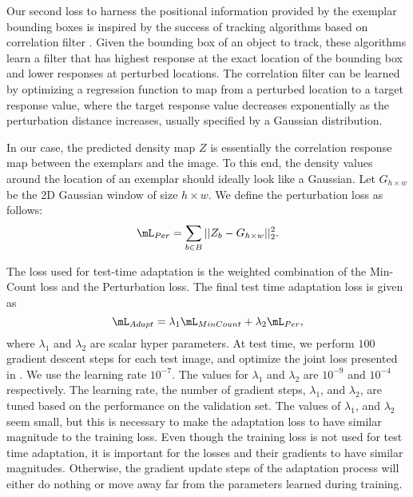  Our second loss to harness the positional information provided by the exemplar bounding boxes is inspired by the success of tracking algorithms based on correlation filter \cite{Henriques-etal-PAMI15,valmadre2017end,wang2019fast}. Given the bounding box of an object to track, these algorithms learn a filter that has highest response at the exact location of the bounding box and lower responses  at perturbed locations. The correlation filter can be learned by  optimizing a regression function to map from a perturbed location to a target response value, where the target response value decreases exponentially as the perturbation distance increases, usually specified by a Gaussian distribution. 

In our case, the predicted density map $Z$ is essentially the correlation response map between the exemplars and the image. To this end, the density values around the location of an exemplar should ideally look like a Gaussian. Let $G_{h \times w}$ be the 2D Gaussian window of size $h{\times}w$. We define the perturbation loss as follows: 
\begin{equation}\label{adaptation2}
\mL_{Per} = \sum_{b \in B} ||Z_b - G_{h \times w}||_2^2.    
\end{equation}

 The loss used for test-time adaptation is the weighted combination of the Min-Count loss and the Perturbation loss. The final test time adaptation loss is given as 
\begin{equation}\label{adaptation3}
    \mL_{Adapt} = \lambda_1 \mL_{MinCount} + \lambda_2 \mL_{Per},
\end{equation}
where $\lambda_1$ and $\lambda_2$ are scalar hyper parameters. At test time, we perform $100$ gradient descent steps for each test image, and optimize the joint loss presented in  . We use the learning rate $10^{-7}$. The values for $\lambda_1$ and $\lambda_2$ are $10^{-9}$ and $10^{-4}$ respectively. 
The learning rate, the number of gradient steps, $\lambda_1$, and $\lambda_2$, are tuned based on the performance on the validation set. 
The values of $\lambda_1$, and $\lambda_2$ seem small, but this is necessary to make the adaptation loss to have similar magnitude to the training loss. Even though the training loss is not used for test time adaptation, it is important for the losses and their gradients to have similar magnitudes. Otherwise, the gradient update steps of the adaptation process will either do nothing or move away far from the parameters learned during training. 

